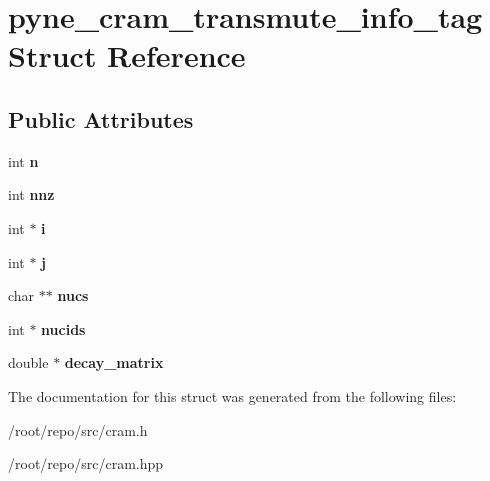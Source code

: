 \hypertarget{structpyne__cram__transmute__info__tag}{}\section{pyne\+\_\+cram\+\_\+transmute\+\_\+info\+\_\+tag Struct Reference}
\label{structpyne__cram__transmute__info__tag}
\subsection*{Public Attributes}
\begin{DoxyCompactItemize}
\item 
\mbox{\label{structpyne__cram__transmute__info__tag_ac288cdd5bdcf7a42524f107f314817bb}} 
int {\bfseries n}
\item 
\mbox{\label{structpyne__cram__transmute__info__tag_a6eb48aee2e991162735b683fa518b8c4}} 
int {\bfseries nnz}
\item 
\mbox{\label{structpyne__cram__transmute__info__tag_a0f2aaa764526bb30e8f4867776ced547}} 
int $\ast$ {\bfseries i}
\item 
\mbox{\label{structpyne__cram__transmute__info__tag_a42e7a923741efea92e3650fe515bed7d}} 
int $\ast$ {\bfseries j}
\item 
\mbox{\label{structpyne__cram__transmute__info__tag_a488f43cedb86c85781e662461a99fa6f}} 
char $\ast$$\ast$ {\bfseries nucs}
\item 
\mbox{\label{structpyne__cram__transmute__info__tag_a100a4bd9e087c3d68596e38ee01ca810}} 
int $\ast$ {\bfseries nucids}
\item 
\mbox{\label{structpyne__cram__transmute__info__tag_a0e8c1bf463754a76fc00d44a663a8fc4}} 
double $\ast$ {\bfseries decay\+\_\+matrix}
\end{DoxyCompactItemize}


The documentation for this struct was generated from the following files\+:\begin{DoxyCompactItemize}
\item 
/root/repo/src/cram.\+h\item 
/root/repo/src/cram.\+hpp\end{DoxyCompactItemize}
